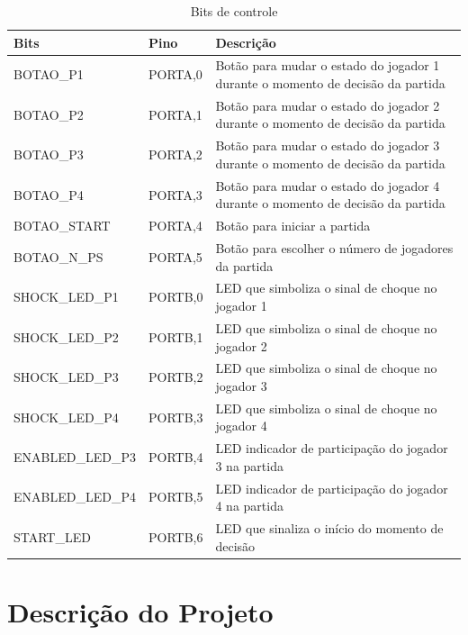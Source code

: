 \documentclass[article]{IEEEtran}
\begin{document}
\begin{table}
  \centering
  \caption{Bits de controle}
  \vspace{0.5cm}
  \label{tab:bits}
  \begin{tabular}{|p{3.4cm}|p{1.4cm}|p{6.2cm}|}\hline
    Bits 		& Pino		& Descrição						\\ \hline
    BOTAO\_P1		& PORTA,0	& Botão para mudar o estado do jogador 1 durante
					  o momento de decisão da partida			\\ \hline
    BOTAO\_P2		& PORTA,1	& Botão para mudar o estado do jogador 2 durante
					  o momento de decisão da partida			\\ \hline
    BOTAO\_P3		& PORTA,2	& Botão para mudar o estado do jogador 3 durante
					  o momento de decisão da partida			\\ \hline
    BOTAO\_P4		& PORTA,3	& Botão para mudar o estado do jogador 4 durante
					  o momento de decisão da partida			\\ \hline
    BOTAO\_START	& PORTA,4	& Botão para iniciar a partida				\\ \hline
    BOTAO\_N\_PS	& PORTA,5	& Botão para escolher o número de jogadores da partida	\\ \hline
    SHOCK\_LED\_P1	& PORTB,0	& LED que simboliza o sinal de choque no jogador 1	\\ \hline
    SHOCK\_LED\_P2	& PORTB,1	& LED que simboliza o sinal de choque no jogador 2	\\ \hline
    SHOCK\_LED\_P3	& PORTB,2	& LED que simboliza o sinal de choque no jogador 3	\\ \hline
    SHOCK\_LED\_P4	& PORTB,3	& LED que simboliza o sinal de choque no jogador 4	\\ \hline
    ENABLED\_LED\_P3	& PORTB,4	& LED indicador de participação do jogador 3 na partida	\\ \hline
    ENABLED\_LED\_P4	& PORTB,5	& LED indicador de participação do jogador 4 na partida	\\ \hline
    START\_LED		& PORTB,6	& LED que sinaliza o início do momento de decisão	\\ \hline
  \end{tabular}
\end{table}

\section{Descrição do Projeto}
\end{document}
